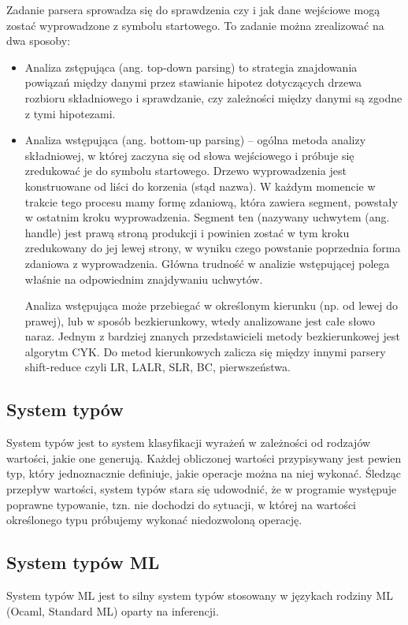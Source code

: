 \documentclass{article}
\begin{document}
\newpage
Zadanie parsera sprowadza się do sprawdzenia czy i jak dane wejściowe mogą zostać wyprowadzone z symbolu startowego. To zadanie można zrealizować na dwa sposoby:


\begin{itemize}
  \item Analiza zstępująca (ang. top-down parsing) to strategia znajdowania powiązań między danymi przez stawianie hipotez dotyczących drzewa rozbioru składniowego i sprawdzanie, czy zależności między danymi są zgodne z tymi hipotezami.
  \item Analiza wstępująca (ang. bottom-up parsing) – ogólna metoda analizy składniowej, w której zaczyna się od słowa wejściowego i próbuje się zredukować je do symbolu startowego. Drzewo wyprowadzenia jest konstruowane od liści do korzenia (stąd nazwa). W każdym momencie w trakcie tego procesu mamy formę zdaniową, która zawiera segment, powstały w ostatnim kroku wyprowadzenia. Segment ten (nazywany uchwytem (ang. handle) jest prawą stroną produkcji i powinien zostać w tym kroku zredukowany do jej lewej strony, w wyniku czego powstanie poprzednia forma zdaniowa z wyprowadzenia. Główna trudność w analizie wstępującej polega właśnie na odpowiednim znajdywaniu uchwytów.

  Analiza wstępująca może przebiegać w określonym kierunku (np. od lewej do prawej), lub w sposób bezkierunkowy, wtedy analizowane jest całe słowo naraz. Jednym z bardziej znanych przedstawicieli metody bezkierunkowej jest algorytm CYK. Do metod kierunkowych zalicza się między innymi parsery shift-reduce czyli LR, LALR, SLR, BC, pierwszeństwa.
\end{itemize}



\subsection{System typów}
System typów jest to system klasyfikacji wyrażeń w zależności od rodzajów wartości, jakie one generują\cite{Pierce__Benjamin__C__2002}. Każdej obliczonej wartości przypisywany jest pewien typ, który jednoznacznie definiuje, jakie operacje można na niej wykonać. Śledząc przepływ wartości, system typów stara się udowodnić, że w programie występuje poprawne typowanie, tzn. nie dochodzi do sytuacji, w której na wartości określonego typu próbujemy wykonać niedozwoloną operację.
\subsection{System typów ML} System typów ML jest to silny system typów stosowany w językach rodziny ML (Ocaml, Standard ML) oparty na inferencji.
\end{document}
